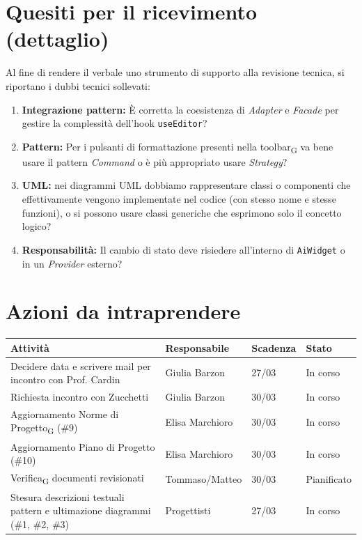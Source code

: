 \documentclass[a4paper,12pt]{article}
\newcommand{\gls}[1]{#1\textsubscript{G}}
\begin{document}
\section*{Quesiti per il ricevimento (dettaglio)}
Al fine di rendere il verbale uno strumento di supporto alla revisione tecnica, si riportano i dubbi tecnici sollevati:
\begin{enumerate}
    \item \textbf{Integrazione pattern:} È corretta la coesistenza di \textit{Adapter} e \textit{Facade} per gestire la complessità dell'hook \texttt{useEditor}?
    \item \textbf{Pattern:} Per i pulsanti di formattazione presenti nella \gls{toolbar} va bene usare il pattern \textit{Command} o è più appropriato usare \textit{Strategy}?
    \item \textbf{UML:} nei diagrammi UML dobbiamo rappresentare classi o componenti che effettivamente vengono implementate nel codice (con stesso nome e stesse funzioni), o si possono usare classi generiche che esprimono solo il concetto logico? 
    \item \textbf{Responsabilità:} Il cambio di stato deve risiedere all'interno di \texttt{AiWidget} o in un \textit{Provider} esterno?
\end{enumerate}

\section*{Azioni da intraprendere}
\begin{longtable}{|p{}|p{}|p{}|p{}|}
\hline
\textbf{Attività} & \textbf{Responsabile} & \textbf{Scadenza} & \textbf{Stato} \\ \hline
Decidere data e scrivere mail per incontro con Prof. Cardin & Giulia Barzon & 27/03 & In corso \\ \hline
Richiesta incontro con Zucchetti & Giulia Barzon & 30/03 & In corso \\ \hline
Aggiornamento \gls{Norme di Progetto} (\#9) & Elisa Marchioro & 30/03 & In corso \\ \hline
Aggiornamento Piano di Progetto (\#10) & Elisa Marchioro & 30/03 & In corso \\ \hline
\gls{Verifica} documenti revisionati & Tommaso/Matteo & 30/03 & Pianificato \\ \hline
Stesura descrizioni testuali pattern e ultimazione diagrammi (\#1, \#2, \#3) & Progettisti & 27/03 & In corso \\ \hline
\end{longtable}
\end{document}
